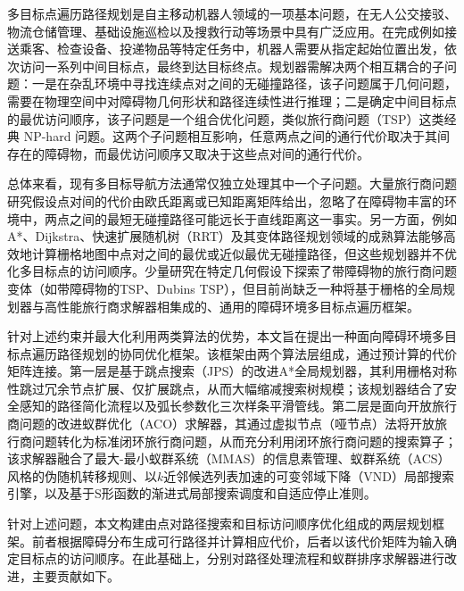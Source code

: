 \documentclass[lettersize,journal]{IEEEtran}
\begin{document}
多目标点遍历路径规划是自主移动机器人领域的一项基本问题，在无人公交接驳、物流仓储管理、基础设施巡检以及搜救行动等场景中具有广泛应用\textcolor{blue}{\cite{ref1,ref2,ref33,ref37,ref38}}。在完成例如接送乘客、检查设备、投递物品等特定任务中，机器人需要从指定起始位置出发，依次访问一系列中间目标点，最终到达目标终点。规划器需解决两个相互耦合的子问题：一是在杂乱环境中寻找连续点对之间的无碰撞路径，该子问题属于几何问题，需要在物理空间中对障碍物几何形状和路径连续性进行推理；二是确定中间目标点的最优访问顺序，该子问题是一个组合优化问题，类似旅行商问题（TSP）这类经典 NP-hard 问题。这两个子问题相互影响，任意两点之间的通行代价取决于其间存在的障碍物，而最优访问顺序又取决于这些点对间的通行代价。

总体来看，现有多目标导航方法通常仅独立处理其中一个子问题。大量旅行商问题研究假设点对间的代价由欧氏距离或已知距离矩阵给出\textcolor{blue}{\cite{ref4,ref36}}，忽略了在障碍物丰富的环境中，两点之间的最短无碰撞路径可能远长于直线距离这一事实\textcolor{blue}{\cite{ref39}}。另一方面，例如A*、Dijkstra、快速扩展随机树（RRT）及其变体路径规划领域的成熟算法能够高效地计算栅格地图中点对之间的最优或近似最优无碰撞路径，但这些规划器并不优化多目标点的访问顺序\textcolor{blue}{\cite{ref5,ref6,ref7}}。少量研究在特定几何假设下探索了带障碍物的旅行商问题变体（如带障碍物的TSP、Dubins TSP），但目前尚缺乏一种将基于栅格的全局规划器与高性能旅行商求解器相集成的、通用的障碍环境多目标点遍历框架。

针对上述约束并最大化利用两类算法的优势，本文旨在提出一种面向障碍环境多目标点遍历路径规划的协同优化框架。该框架由两个算法层组成，通过预计算的代价矩阵连接。第一层是基于跳点搜索（JPS）的改进A*全局规划器，其利用栅格对称性跳过冗余节点扩展、仅扩展跳点，从而大幅缩减搜索树规模；该规划器结合了安全感知的路径简化流程以及弧长参数化三次样条平滑管线。第二层是面向开放旅行商问题的改进蚁群优化（ACO）求解器，其通过虚拟节点（哑节点）法将开放旅行商问题转化为标准闭环旅行商问题，从而充分利用闭环旅行商问题的搜索算子；该求解器融合了最大-最小蚁群系统（MMAS）的信息素管理、蚁群系统（ACS）风格的伪随机转移规则、以$k$近邻候选列表加速的可变邻域下降（VND）局部搜索引擎，以及基于S形函数的渐进式局部搜索调度和自适应停止准则。

针对上述问题，本文构建由点对路径搜索和目标访问顺序优化组成的两层规划框架。前者根据障碍分布生成可行路径并计算相应代价，后者以该代价矩阵为输入确定目标点的访问顺序。在此基础上，分别对路径处理流程和蚁群排序求解器进行改进，主要贡献如下。
\end{document}
